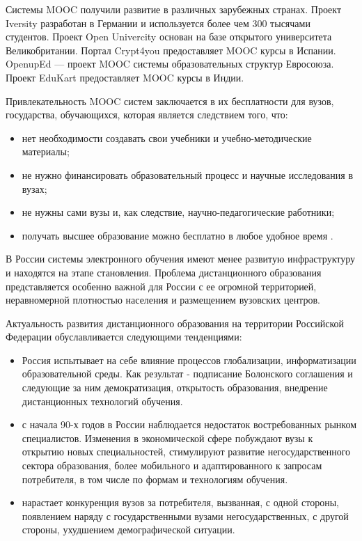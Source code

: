 Системы MOOC получили развитие в различных зарубежных странах. Проект Iversity разработан в Германии и используется более чем 300 тысячами студентов. Проект Open Univercity основан на базе открытого университета Великобритании. Портал Crypt4you предоставляет MOOC курсы в Испании. OpenupEd — проект MOOC системы образовательных структур Евросоюза. Проект EduKart предоставляет MOOC курсы в Индии.

Привлекательность MOOC систем заключается в их бесплатности для вузов, государства, обучающихся, которая является следствием того, что:

\begin{itemize}
\item нет необходимости создавать свои учебники и учебно-методические материалы;
\item не нужно финансировать образовательный процесс и научные исследования в вузах;
\item не нужны сами вузы и, как следствие, научно-педагогические работники;
\item получать высшее образование можно бесплатно в любое удобное время \cite{kollesnicov2014aprch}.
\end{itemize}

В России системы электронного обучения имеют менее развитую инфраструктуру и находятся на этапе становления. Проблема дистанционного образования представляется особенно важной для России с ее огромной территорией, неравномерной плотностью населения и размещением вузовских центров.

Актуальность развития дистанционного образования на территории Российской Федерации обуславливается следующими тенденциями:

\begin{itemize}
\item Россия испытывает на себе влияние процессов глобализации, информатизации образовательной среды. Как результат - подписание Болонского соглашения и следующие за ним демократизация, открытость образования, внедрение дистанционных технологий обучения.
\item с начала 90-х годов в России наблюдается недостаток востребованных рынком специалистов. Изменения в экономической сфере побуждают вузы к открытию новых специальностей, стимулируют развитие негосударственного сектора образования, более мобильного и адаптированного к запросам потребителя, в том числе по формам и технологиям обучения.
\item нарастает конкуренция вузов за потребителя, вызванная, с одной стороны, появлением наряду с государственными вузами негосударственных, с другой стороны, ухудшением демографической ситуации.
\end{itemize}

